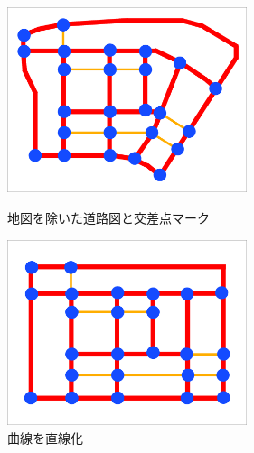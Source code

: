 \begin{figure}[htbp]
    \begin{minipage}{0.5\hsize}
        \begin{center}
            \includegraphics[width=70mm]{assets/MAP_3.eps}
        \end{center}
        \caption{地図を除いた道路図と交差点マーク}
        \label{rs:3}
    \end{minipage}
    \begin{minipage}{0.5\hsize}
        \begin{center}
            \includegraphics[width=70mm]{assets/MAP_4.eps}
        \end{center}
        \caption{曲線を直線化}
        \label{rs:4}
    \end{minipage}
\end{figure}




